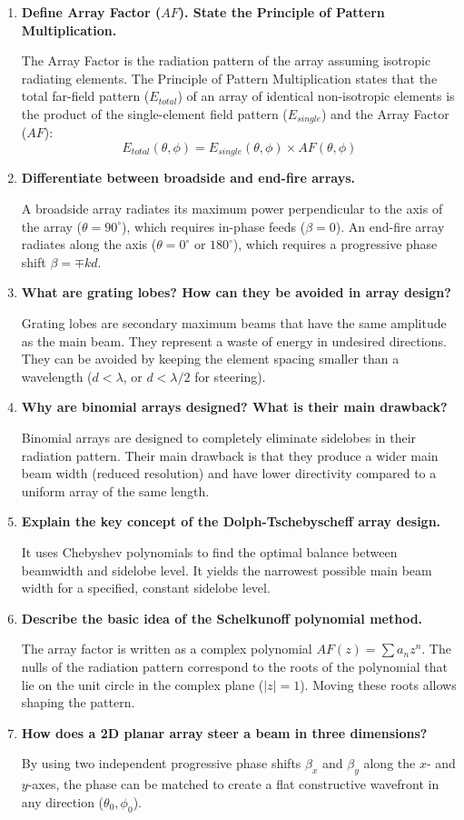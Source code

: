 \documentclass[12pt,a4paper]{article}
\newcommand{\Q}[1]{\textbf{#1}\par\noindent\ignorespaces}
\begin{document}
\begin{tcolorbox}[exambox, title={\textbf{Frequently Asked / Viva Questions}}]
\begin{enumerate}[topsep=0pt, label=\textbf{Q\arabic*.}, itemsep=5pt]
  \item \Q{Define Array Factor ($AF$). State the Principle of Pattern Multiplication.}
    The Array Factor is the radiation pattern of the array assuming isotropic radiating elements. The Principle of Pattern Multiplication states that the total far-field pattern ($E_{total}$) of an array of identical non-isotropic elements is the product of the single-element field pattern ($E_{single}$) and the Array Factor ($AF$):
    \[
    E_{total}(\theta, \phi) = E_{single}(\theta, \phi) \times AF(\theta, \phi)
    \]
  \item \Q{Differentiate between broadside and end-fire arrays.}
    A broadside array radiates its maximum power perpendicular to the axis of the array ($\theta = 90^\circ$), which requires in-phase feeds ($\beta = 0$). An end-fire array radiates along the axis ($\theta = 0^\circ$ or $180^\circ$), which requires a progressive phase shift $\beta = \mp kd$.
  \item \Q{What are grating lobes? How can they be avoided in array design?}
    Grating lobes are secondary maximum beams that have the same amplitude as the main beam. They represent a waste of energy in undesired directions. They can be avoided by keeping the element spacing smaller than a wavelength ($d < \lambda$, or $d < \lambda/2$ for steering).
  \item \Q{Why are binomial arrays designed? What is their main drawback?}
    Binomial arrays are designed to completely eliminate sidelobes in their radiation pattern. Their main drawback is that they produce a wider main beam width (reduced resolution) and have lower directivity compared to a uniform array of the same length.
  \item \Q{Explain the key concept of the Dolph-Tschebyscheff array design.}
    It uses Chebyshev polynomials to find the optimal balance between beamwidth and sidelobe level. It yields the narrowest possible main beam width for a specified, constant sidelobe level.
  \item \Q{Describe the basic idea of the Schelkunoff polynomial method.}
    The array factor is written as a complex polynomial $AF(z) = \sum a_n z^n$. The nulls of the radiation pattern correspond to the roots of the polynomial that lie on the unit circle in the complex plane ($|z| = 1$). Moving these roots allows shaping the pattern.
  \item \Q{How does a 2D planar array steer a beam in three dimensions?}
    By using two independent progressive phase shifts $\beta_x$ and $\beta_y$ along the $x$- and $y$-axes, the phase can be matched to create a flat constructive wavefront in any direction ($\theta_0, \phi_0$).
\end{enumerate}
\end{tcolorbox}
\end{document}
